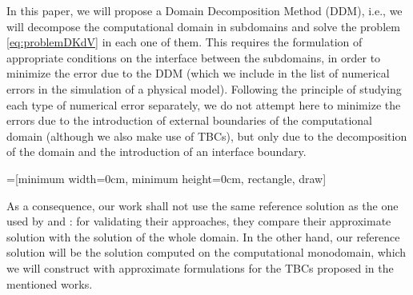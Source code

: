 \indent In this paper, we will propose a Domain Decomposition Method (DDM), i.e., we will decompose the computational domain in subdomains and solve the problem \eqref{eq:problemDKdV} in each one of them. This requires the formulation of appropriate conditions on the interface between the subdomains, in order to minimize the error due to the DDM (which we include in the list of numerical errors in the simulation of a physical model). Following the principle of studying each type of numerical error separately, we do not attempt here to minimize the errors due to the introduction of external boundaries of the computational domain (although we also make use of TBCs), but only due to the decomposition of the domain and the introduction of an interface boundary.


=[minimum width=0cm, minimum height=0cm, rectangle,
			draw]
			
%	

\noindent As a consequence, our work shall not use the same reference solution as the one used by \cite{zheng2008} and \cite{besse2015} : for validating their approaches,  they compare their approximate solution with the solution of the whole domain. In the other hand, our reference solution will be the solution computed on the computational monodomain, which we will construct with approximate formulations for the TBCs proposed in the mentioned works.